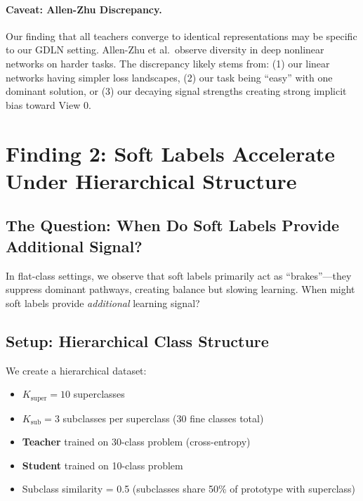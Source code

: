 \documentclass{article}
\begin{document}
\paragraph{Caveat: Allen-Zhu Discrepancy.} Our finding that all teachers converge to identical representations may be specific to our GDLN setting. Allen-Zhu et al.\ observe diversity in deep nonlinear networks on harder tasks. The discrepancy likely stems from: (1) our linear networks having simpler loss landscapes, (2) our task being ``easy'' with one dominant solution, or (3) our decaying signal strengths creating strong implicit bias toward View 0.

\section{Finding 2: Soft Labels Accelerate Under Hierarchical Structure}
\label{sec:hierarchical}

\subsection{The Question: When Do Soft Labels Provide Additional Signal?}

In flat-class settings, we observe that soft labels primarily act as ``brakes''---they suppress dominant pathways, creating balance but slowing learning. When might soft labels provide \textit{additional} learning signal?

\subsection{Setup: Hierarchical Class Structure}

We create a hierarchical dataset:
\begin{itemize}
    \item $K_{\text{super}} = 10$ superclasses
    \item $K_{\text{sub}} = 3$ subclasses per superclass (30 fine classes total)
    \item \textbf{Teacher} trained on 30-class problem (cross-entropy)
    \item \textbf{Student} trained on 10-class problem
    \item Subclass similarity = 0.5 (subclasses share 50\% of prototype with superclass)
\end{itemize}
\end{document}
